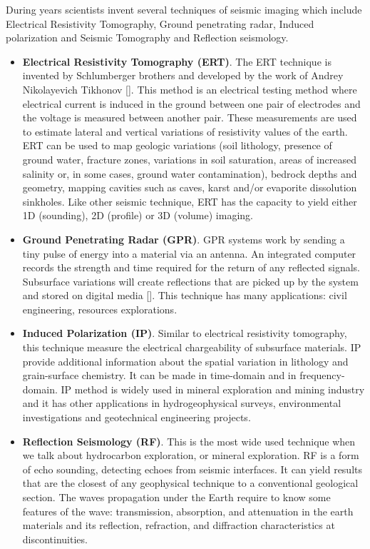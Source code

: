 During years scientists invent several techniques of seismic imaging which include Electrical Resistivity Tomography,  Ground penetrating radar, Induced polarization and Seismic Tomography and Reflection seismology.
\begin{itemize}
\item \textbf{Electrical Resistivity Tomography (ERT)}. The ERT technique is invented by Schlumberger brothers and developed by the work of Andrey Nikolayevich Tikhonov []. This method is an electrical testing method where electrical current is induced in the ground between one pair of electrodes and the voltage is measured between another pair. These measurements are used to estimate lateral and vertical variations of resistivity values of the earth. ERT can be used to map geologic variations (soil lithology, presence of ground water, fracture zones, variations in soil saturation, areas of increased salinity or, in some cases, ground water contamination), bedrock depths and geometry, mapping cavities such as caves, karst and/or evaporite dissolution sinkholes. Like other seismic technique, ERT has the capacity to yield either 1D (sounding), 2D (profile) or 3D (volume) imaging.  

\item \textbf{Ground Penetrating Radar (GPR)}. GPR systems work by sending a tiny pulse of energy into a material via an antenna. An integrated computer records the strength and time required for the return of any reflected signals. Subsurface variations will create reflections that are picked up by the system and stored on digital media []. This technique has many applications: civil engineering, resources explorations.  

\item \textbf{Induced Polarization (IP)}. Similar to electrical resistivity tomography, this technique measure the electrical chargeability of subsurface materials. IP provide additional information about the spatial variation in lithology and grain-surface chemistry. It can be made in time-domain and in frequency-domain.  IP method is widely used in mineral exploration and mining industry and it has other applications in hydrogeophysical surveys, environmental investigations and geotechnical engineering projects.
 
\item \textbf{Reflection Seismology (RF)}. This is the most wide used technique when we talk about hydrocarbon exploration, or mineral exploration. RF is a form of echo sounding, detecting echoes from seismic interfaces. It can yield results that are the closest of any geophysical technique to a conventional geological section. The waves propagation under the Earth require to know some features of the wave: transmission, absorption, and attenuation in the earth materials and its reflection, refraction, and diffraction characteristics
at discontinuities.   


\end{itemize}

